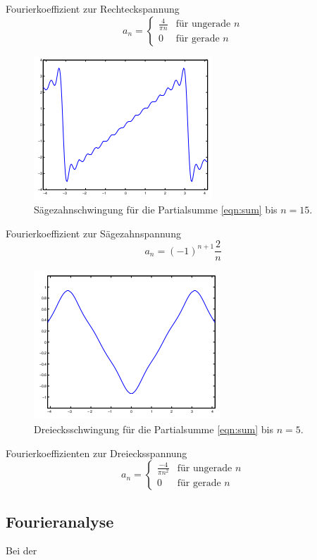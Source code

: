Fourierkoeffizient zur Rechteckspannung
\begin{equation}
  a_n =
  \begin{cases}
      \frac{4}{\pi n} & \text{für ungerade } n\\
      0 & \text{für gerade } n
  \end{cases}
\end{equation}
\begin{figure}[H]
  \centering
  \includegraphics{content/images/saege_theo_n=15.png}
  \caption{Sägezahnschwingung für die Partialsumme \eqref{eqn:sum} bis $n=15$\cite{koeff}.}
  \label{fig:saege_theo}
\end{figure}
Fourierkoeffizient zur Sägezahnspannung
\begin{equation}
  a_n = (-1)^{n+1}\frac{2}{n}
\end{equation}
\begin{figure}[H]
  \centering
  \includegraphics{content/images/dreieck_theo_n=5.png}
  \caption{Dreiecksschwingung für die Partialsumme \eqref{eqn:sum} bis $n=5$\cite{koeff}.}
  \label{fig:dreieck_theo}
\end{figure}
Fourierkoeffizienten zur Dreiecksspannung
\begin{equation}
  a_n =
  \begin{cases}
    \frac{-4}{\pi n^2} & \text{für ungerade }n\\
    0 & \text{für gerade }n
  \end{cases}
\end{equation}

\subsection{Fourieranalyse}
Bei der
